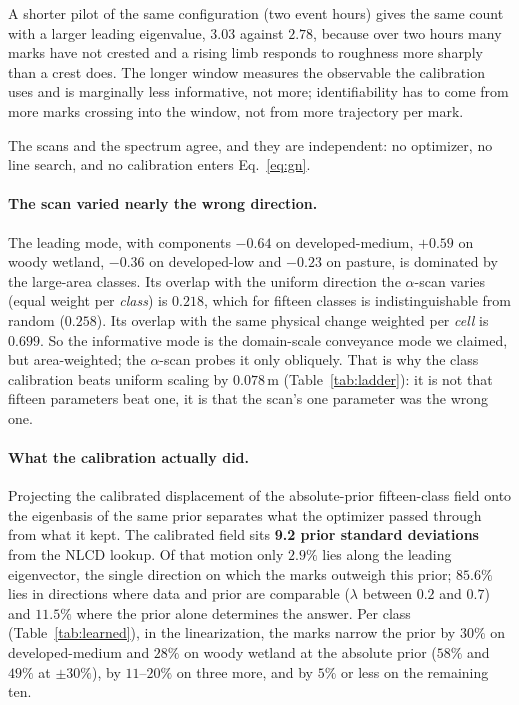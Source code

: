 \documentclass[11pt]{article}
\begin{document}
A shorter pilot of the same configuration (two event hours) gives the
same count with a larger leading eigenvalue, $3.03$ against
$2.78$, because over two hours many marks have not crested and a
rising limb responds to roughness more sharply than a crest does. The
longer window measures the observable the calibration uses and is
marginally less informative, not more; identifiability has to come
from more marks crossing into the window, not from more trajectory
per mark.

The scans and the spectrum agree, and they are
independent: no optimizer, no line search, and no calibration enters
Eq.~\eqref{eq:gn}.

\paragraph{The scan varied nearly the wrong direction.}
The leading mode, with components
$-0.64$ on developed-medium, $+0.59$ on woody wetland, $-0.36$ on
developed-low and $-0.23$ on pasture, is dominated by the
large-area classes. Its overlap with the uniform direction the
$\alpha$-scan varies (equal weight per \emph{class}) is $0.218$,
which for fifteen classes is indistinguishable from random ($0.258$).
Its overlap with the same physical change weighted per \emph{cell} is
$0.699$. So the informative mode is the domain-scale conveyance mode we
claimed, but area-weighted; the $\alpha$-scan probes it only obliquely.
That is why the class calibration beats uniform scaling by $0.078$\,m
(Table~\ref{tab:ladder}): it is not that fifteen parameters beat one, it
is that the scan's one parameter was the wrong one.

\paragraph{What the calibration actually did.}
Projecting the calibrated displacement of the absolute-prior
fifteen-class field onto the eigenbasis of the same prior separates
what the optimizer passed through from what it kept. The calibrated
field sits \textbf{9.2 prior standard deviations} from the NLCD lookup.
Of that motion only $2.9\%$ lies along the leading eigenvector, the
single direction on which the marks outweigh this prior; $85.6\%$ lies
in directions where data and prior are comparable ($\lambda$ between
$0.2$ and $0.7$) and $11.5\%$ where the prior alone determines the
answer. Per class
(Table~\ref{tab:learned}), in the linearization, the marks narrow the
prior by $30\%$ on developed-medium and $28\%$ on woody wetland at
the absolute prior ($58\%$ and $49\%$ at $\pm 30\%$), by $11$--$20\%$
on three more, and by $5\%$ or less on the remaining ten.
\end{document}
